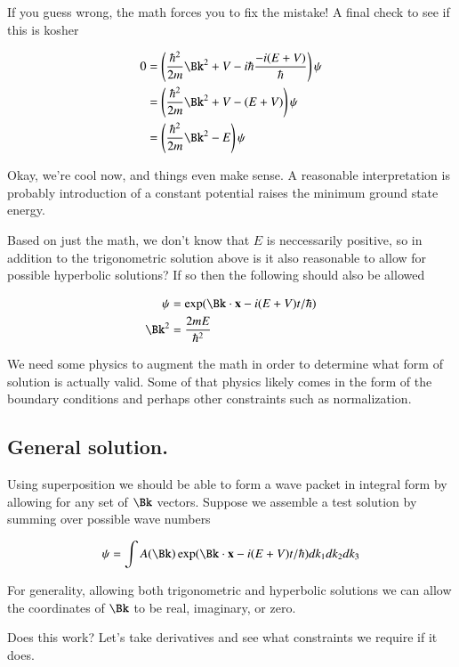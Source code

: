 \documentclass{article}
\begin{document}
If you guess wrong, the math forces you to fix the mistake!  A final check to see if this is kosher 

\begin{align*}
0 &=
\left(\frac{\hbar^2}{2m}\Bk^2 + V -i\hbar \frac{-i(E + V)}{\hbar}\right)\psi \\
&= \left(\frac{\hbar^2}{2m}\Bk^2 + V -(E + V)\right)\psi \\
&= \left(\frac{\hbar^2}{2m}\Bk^2 - E\right)\psi \\
\end{align*}

Okay, we're cool now, and things even make sense.  A reasonable interpretation is probably introduction of a constant potential raises the minimum ground state energy.

Based on just the math, we don't know that $E$ is neccessarily positive, so in addition to the trigonometric solution above is it also reasonable to
allow for possible
hyperbolic solutions?  If so then the following should also be allowed

\begin{align*}
\psi &= \exp(\Bk \cdot \Bx - i(E + V) t/\hbar) \\
\Bk^2 &= \frac{2 m E}{\hbar^2}
\end{align*}

We need some physics
to augment the math in order to determine what form of solution is actually valid.  Some of that physics likely comes in the form of the boundary conditions and perhaps other constraints such as normalization.

\subsection{ General solution. }

Using superposition we should be able to form a wave packet in integral form
by allowing for any set of $\Bk$ vectors.  Suppose we assemble a test solution by summing over possible wave numbers

\begin{align*}
\psi = \int A(\Bk) \exp(\Bk \cdot \Bx - i(E + V) t/\hbar) dk_1 dk_2 dk_3 \\
\end{align*}

For generality, allowing both trigonometric and hyperbolic solutions we can
allow the coordinates of $\Bk$ to be real, imaginary, or zero.

Does this work?  Let's take derivatives and see what constraints we require if it does.
\end{document}
